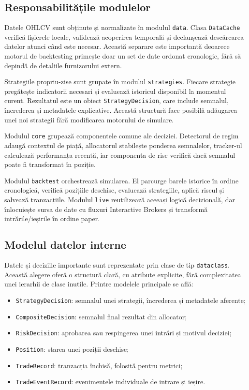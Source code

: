 \subsection{Responsabilitățile modulelor}
\label{cap:cap3:responsabilitati}

Datele OHLCV sunt obținute și normalizate în modulul \texttt{data}. Clasa \texttt{DataCache} verifică fișierele locale, validează acoperirea temporală și declanșează descărcarea datelor atunci când este necesar. Această separare este importantă deoarece motorul de backtesting primește doar un set de date ordonat cronologic, fără să depindă de detaliile furnizorului extern.

Strategiile propriu-zise sunt grupate în modulul \texttt{strategies}. Fiecare strategie pregătește indicatorii necesari și evaluează istoricul disponibil la momentul curent. Rezultatul este un obiect \texttt{StrategyDecision}, care include semnalul, încrederea și metadatele explicative. Această structură face posibilă adăugarea unei noi strategii fără modificarea motorului de simulare.

Modulul \texttt{core} grupează componentele comune ale deciziei. Detectorul de regim adaugă contextul de piață, allocatorul stabilește ponderea semnalelor, tracker-ul calculează performanța recentă, iar componenta de risc verifică dacă semnalul poate fi transformat în poziție.

Modulul \texttt{backtest} orchestrează simularea. El parcurge barele istorice în ordine cronologică, verifică pozițiile deschise, evaluează strategiile, aplică riscul și salvează tranzacțiile. Modulul \texttt{live} reutilizează aceeași logică decizională, dar înlocuiește sursa de date cu fluxuri Interactive Brokers și transformă intrările/ieșirile în ordine paper.

\subsection{Modelul datelor interne}
\label{cap:cap3:model_date}

Datele și deciziile importante sunt reprezentate prin clase de tip \texttt{dataclass}. Această alegere oferă o structură clară, cu atribute explicite, fără complexitatea unei ierarhii de clase inutile. Printre modelele principale se află:

\begin{itemize}
    \item \texttt{StrategyDecision}: semnalul unei strategii, încrederea și metadatele aferente;
    \item \texttt{CompositeDecision}: semnalul final rezultat din allocator;
    \item \texttt{RiskDecision}: aprobarea sau respingerea unei intrări și motivul deciziei;
    \item \texttt{Position}: starea unei poziții deschise;
    \item \texttt{TradeRecord}: tranzacția închisă, folosită pentru metrici;
    \item \texttt{TradeEventRecord}: evenimentele individuale de intrare și ieșire.
\end{itemize}

